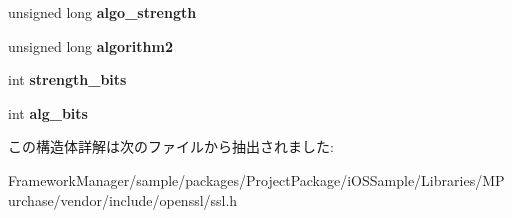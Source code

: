 \begin{DoxyCompactItemize}
\item 
\hypertarget{structssl__cipher__st_a7c6a3fecb3d246870ccb803260dc2b51}{}unsigned long {\bfseries algo\+\_\+strength}\label{structssl__cipher__st_a7c6a3fecb3d246870ccb803260dc2b51}

\item 
\hypertarget{structssl__cipher__st_aef80da6412c4e1fec8458c3c244d69e8}{}unsigned long {\bfseries algorithm2}\label{structssl__cipher__st_aef80da6412c4e1fec8458c3c244d69e8}

\item 
\hypertarget{structssl__cipher__st_ae3a40fb67452514df7770e334a99c32d}{}int {\bfseries strength\+\_\+bits}\label{structssl__cipher__st_ae3a40fb67452514df7770e334a99c32d}

\item 
\hypertarget{structssl__cipher__st_a451f084cd7c875897f5986a35a482628}{}int {\bfseries alg\+\_\+bits}\label{structssl__cipher__st_a451f084cd7c875897f5986a35a482628}

\end{DoxyCompactItemize}


この構造体詳解は次のファイルから抽出されました\+:\begin{DoxyCompactItemize}
\item 
Framework\+Manager/sample/packages/\+Project\+Package/i\+O\+S\+Sample/\+Libraries/\+M\+Purchase/vendor/include/openssl/ssl.\+h\end{DoxyCompactItemize}
